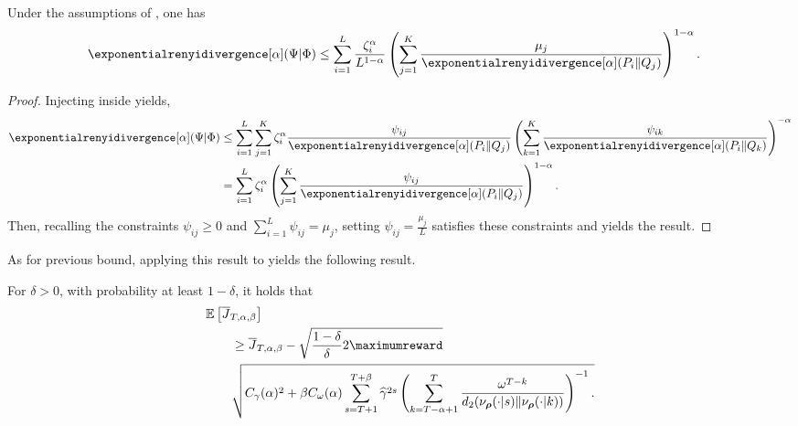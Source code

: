 \begin{prop}
Under the assumptions of , one has
    \begin{align*}
        \exponentialrenyidivergence[\alpha](\Psi\vert\Phi)
        &\leq \sum_{i=1}^L \frac{\zeta_i^\alpha}{L^{1-\alpha}}
        \left(
            \sum_{j=1}^K \frac{\mu_j}{\exponentialrenyidivergence[\alpha](P_i \Vert Q_j)}
        \right)^{1-\alpha}.
    \end{align*}
\end{prop}
\begin{proof}
    Injecting  inside  yields,
    \begin{align*}
        \exponentialrenyidivergence[\alpha](\Psi\vert\Phi)
        &\leq \sum_{i=1}^L\sum_{j=1}^K \zeta_i^\alpha \frac{\psi_{ij}}{\exponentialrenyidivergence[\alpha](P_i \Vert Q_j)}
        \left(
            \sum_{k=1}^K \frac{\psi_{ik}}{\exponentialrenyidivergence[\alpha](P_i \Vert Q_k)}
        \right)^{-\alpha}
        \\
        &= \sum_{i=1}^L \zeta_i^\alpha
        \left(
            \sum_{j=1}^K \frac{\psi_{ij}}{\exponentialrenyidivergence[\alpha](P_i \Vert Q_j)}
        \right)^{1-\alpha}.
    \end{align*}
    Then, recalling the constraints $\psi_{ij}\geq 0$ and $\textstyle\sum_{i=1}^L \psi_{ij}=\mu_j$, setting $\psi_{ij}=\frac{\mu_j}{L}$ satisfies these constraints and yields the result.
\end{proof}

As for previous bound, applying this result to  yields the following result.
    
\begin{prop}
    For $\delta>0$, with probability at least $1-\delta$, it holds that 
    \begin{align*}
        &\mathbb{E}\left[\overline{J}_{T,\alpha,\beta} \right] 
        \\
        &\qquad \geq  \overline{J}_{T,\alpha,\beta} - 
        \sqrt{
            \frac{1-\delta}{\delta} 2  \maximumreward  }
        \\
        &\qquad
        \sqrt{
            C_\gamma(\alpha)^2 +
            \beta C_\omega(\alpha) 
            \sum_{s=T+1}^{T+\beta} \widehat{\gamma}^{2s}
            \left(
                \sum_{k=T-\alpha+1}^T\frac{\omega^{T-k}}{ d_2(\nu_{\boldsymbol\rho}(\cdot\vert s)\Vert \nu_{\boldsymbol\rho}(\cdot\vert k))}
            \right)^{-1}.
        }
    \end{align*}
\end{prop}


